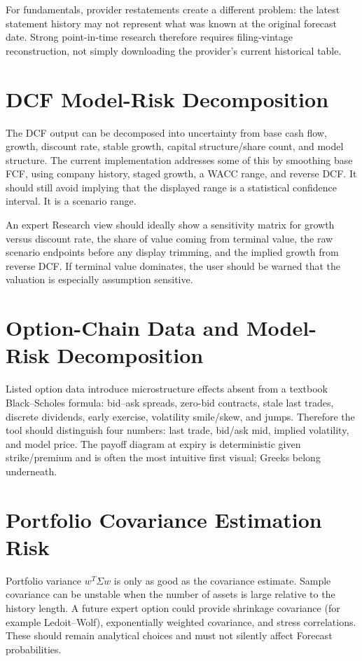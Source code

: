\documentclass[11pt]{article}
\begin{document}
For fundamentals, provider restatements create a different problem: the latest statement history may not represent what was known at the original forecast date. Strong point-in-time research therefore requires filing-vintage reconstruction, not simply downloading the provider's current historical table.

\section{DCF Model-Risk Decomposition}
The DCF output can be decomposed into uncertainty from base cash flow, growth, discount rate, stable growth, capital structure/share count, and model structure. The current implementation addresses some of this by smoothing base FCF, using company history, staged growth, a WACC range, and reverse DCF. It should still avoid implying that the displayed range is a statistical confidence interval. It is a scenario range.

An expert Research view should ideally show a sensitivity matrix for growth versus discount rate, the share of value coming from terminal value, the raw scenario endpoints before any display trimming, and the implied growth from reverse DCF. If terminal value dominates, the user should be warned that the valuation is especially assumption sensitive.

\section{Option-Chain Data and Model-Risk Decomposition}
Listed option data introduce microstructure effects absent from a textbook Black--Scholes formula: bid--ask spreads, zero-bid contracts, stale last trades, discrete dividends, early exercise, volatility smile/skew, and jumps. Therefore the tool should distinguish four numbers: last trade, bid/ask mid, implied volatility, and model price. The payoff diagram at expiry is deterministic given strike/premium and is often the most intuitive first visual; Greeks belong underneath.

\section{Portfolio Covariance Estimation Risk}
Portfolio variance $w^T\Sigma w$ is only as good as the covariance estimate. Sample covariance can be unstable when the number of assets is large relative to the history length. A future expert option could provide shrinkage covariance (for example Ledoit--Wolf), exponentially weighted covariance, and stress correlations. These should remain analytical choices and must not silently affect Forecast probabilities.
\end{document}
